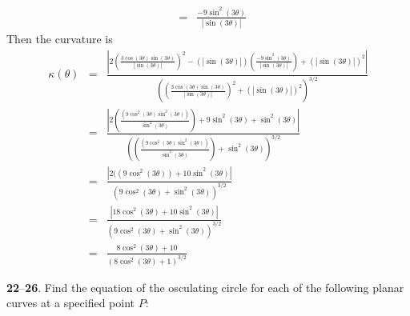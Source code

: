 \documentclass[12pt]{amsbook}
\begin{document}
\begin{enumerate}
\begin{eqnarray*}
   &=&\frac{-9\sin^2(3\theta)}{|\sin(3\theta)|}
 \end{eqnarray*}
 Then the curvature is
\begin{eqnarray*}
\kappa(\theta)&=&\frac{|2(\frac{3\cos(3\theta)\sin(3\theta)}{|\sin(3\theta)|})^2-(|\sin(3\theta)|)(\frac{-9\sin^2(3\theta)}{|\sin(3\theta)|})+(|\sin(3\theta)|)^2|}{((\frac{3\cos(3\theta)\sin(3\theta)}{|\sin(3\theta)|})^2+(|\sin(3\theta)|)^2)^{3/2}}\\
&=&\frac{|2(\frac{(9\cos^2(3\theta)\sin^2(3\theta))}{\sin^2(3\theta)})+9\sin^2(3\theta)+\sin^2(3\theta)|}{((\frac{(9\cos^2(3\theta)\sin^2(3\theta))}{\sin^2(3\theta)})+\sin^2(3\theta))^{3/2}}\\
&=&\frac{|2((9\cos^2(3\theta))+10\sin^2(3\theta)|}{(9\cos^2(3\theta)+\sin^2(3\theta))^{3/2}}\\
&=&\frac{|18\cos^2(3\theta)+10\sin^2(3\theta)|}{(9\cos^2(3\theta)+\sin^2(3\theta))^{3/2}}\\
&=&\frac{8\cos^2(3\theta)+10}{(8\cos^2(3\theta)+1)^{3/2}}
\end{eqnarray*}
\end{enumerate}
\noindent
{\small {\bf 22}--{\bf 26}}. Find the equation of the osculating circle for each of the following
planar curves at a specified point $P$:
\end{document}
